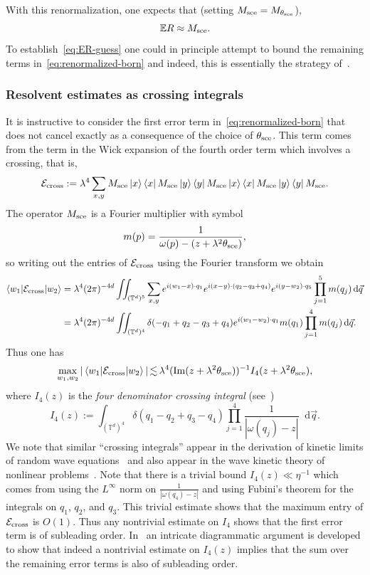 \documentclass[11pt]{amsart}
\def\Torus{{\mathbb T}}
\newcommand{\diff}{\mathop{}\!\mathrm{d}}
\newcommand{\Impt}{\operatorname*{Im}}
\def\lsim{{\,\lesssim\,}}
\def\bra#1{\mathinner{\langle{#1}|}}
\def\ket#1{\mathinner{|{#1}\rangle}}
\def\braket#1{\mathinner{\langle{#1}\rangle}}
\newcommand{\mcal}[1]{{\mathcal{#1}}}
\numberwithin{equation}{section}
\numberwithin{theorem}{section}
\begin{document}
With this renormalization, one expects that (setting $M_{\rm sce} = M_{\theta_{\rm sce}}$),
\begin{equation}
\label{eq:ER-guess}
\mathbb{E}R \approx M_{\rm sce}.
\end{equation}
To establish~\eqref{eq:ER-guess} one could in principle attempt to bound the remaining terms in~\eqref{eq:renormalized-born}
and indeed, this is essentially the strategy of~\cite{ESYRSE,ESYAnderson}.


\subsubsection{Resolvent estimates as crossing integrals}
\label{sec:crossingdiscussion}
It is instructive to consider the first error term in~\eqref{eq:renormalized-born} that does not cancel exactly as a consequence
of the choice of $\theta_{\rm sce}$.  This term comes from the term in the Wick expansion of the fourth order term which involves a crossing, that is,
\begin{equation}
\label{eq:crossing-term}
\mcal{E}_{\rm cross} := \lambda^4 \sum_{x,y} M_{\rm sce} \ket{x}\bra{x} M_{\rm sce} \ket{y}\bra{y}M_{\rm sce}\ket{x}\bra{x} M_{\rm sce}
\ket{y}\bra{y} M_{\rm sce}.
\end{equation}
The operator $M_{\rm sce}$ is a Fourier multiplier with symbol
\[
m(p) = \frac{1}{\omega(p) - (z+\lambda^2\theta_{\rm sce})},
\]
so writing out the entries of $\mcal{E}_{\rm cross}$ using the Fourier transform we obtain
\begin{align*}
\braket{w_1 | \mcal{E}_{\rm cross} | w_2}
&= \lambda^4  (2\pi)^{-4d} \iint_{(\Torus^d)^5} \sum_{x,y} e^{i(w_1-x)\cdot q_1} e^{i(x-y)\cdot (q_2-q_3+q_4)} e^{i(y-w_2)\cdot q_5}
\prod_{j=1}^5 m(q_j) \diff \vec{q} \\
&= \lambda^4  (2\pi)^{-4d} \iint_{(\Torus^d)^4} \delta(-q_1+q_2-q_3+q_4)
e^{i(w_1-w_2) \cdot q_1} m(q_1) \prod_{j=1}^4 m(q_j) \diff \vec{q}.
\end{align*}
Thus one has
\[
\max_{w_1,w_2} |\braket{w_1 | \mcal{E}_{\rm cross} | w_2}| \lsim
\lambda^4 (\Impt (z + \lambda^2\theta_{\rm sce}))^{-1}
I_4(z+\lambda^2\theta_{\rm sce}),
\]
where $I_4(z)$ is the
\textit{four denominator crossing integral} (see~\cite{ErdosSalmhofer,lukkarinen2007asymptotics})
\[
I_4(z) :=
\int_{(\Torus^d)^4}
\delta(q_1-q_2+q_3-q_4)\prod_{j=1}^4 \frac{1}{|\omega(q_j)-z|}
\diff \vec{q}.
\]
We note that similar ``crossing integrals''
appear in the derivation of kinetic limits of random wave equations~\cite{lukkarinen2007kinetic}
and also appear in the wave kinetic theory of nonlinear problems~\cite{deng2021derivation,staffilani2021wave}.  Note that
there is a trivial bound $I_4(z) \ll \eta^{-1}$ which comes from using the $L^\infty$ norm on $\frac{1}{|\omega(q_4)-z|}$ and using Fubini's
theorem for the integrals on $q_1$, $q_2$, and $q_3$.  This trivial estimate shows that the maximum entry of $\mcal{E}_{\rm cross}$
is $O(1)$.  Thus any nontrivial estimate on $I_4$ shows that the first error term is of subleading order.   In~\cite{ESYAnderson}
an intricate diagrammatic argument is developed to show that indeed a nontrivial estimate on $I_4(z)$ implies that the
sum over the remaining error terms is also of subleading order.
\end{document}
